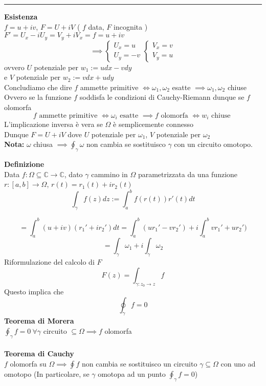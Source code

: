 \documentclass[a4paper]{article}
\newcommand{\C}{\mathbb{C}}
\begin{document}
\noindent\rule{\textwidth}{0.5pt}
\textbf{Esistenza}
\\$f=u+iv$, $F=U+iV$ ( $f$ data, $F$ incognita )
\\$F'=U_x-iU_y=V_y+iV_x=f=u+iv$
\[
	\implies \begin{cases}
	U_x=u\\U_y=-v
\end{cases}
	\begin{cases}
	V_x=v\\V_y=u
\end{cases}
\]
ovvero $U$ potenziale per $w_1:=udx-vdy$
\\e $V$ potenziale per $w_2:=vdx+udy$
\\Concludiamo che dire $f$ ammette primitive $\iff\omega_1,\omega_2$ esatte $\implies\omega_1,\omega_2$ chiuse
\\Ovvero se la funzione $f$ soddisfa le condizioni di Cauchy-Riemann dunque se $f$ olomorfa
\[f\text{ ammette primitive }\iff\omega_i \text{ esatte }\implies f \text{ olomorfa }\iff w_i\text{ chiuse }\]
L'implicazione inversa è vera se $\Omega$ è semplicemente connesso
\\Dunque $F=U+iV$ dove $U$ potenziale per $\omega_1$, $V$ potenziale per $\omega_2$
\\\textbf{Nota: } $\omega$ chiusa $\implies \oint_\gamma \omega$ non cambia se sostituisco $\gamma$ con un circuito omotopo. 
\begin{tcolorbox}
	\textbf{Definizione} 
	\\Data $f:\Omega\subseteq\C\to \C$, dato $\gamma$ cammino in $\Omega$ parametrizzata da una funzione $r:[a,b]\to \Omega$, $r(t)=r_1(t)+ir_2(t)$
	\[\int_{\gamma}^{} f(z)dz:=\int_{a}^{b} f(r(t))r'(t)dt\]

\end{tcolorbox}
	\[=\int_{a}^{b} (u+iv)(r_1'+ir_2')dt=\int_{a}^{b} (ur_1'-vr_2')+i \int_{a}^{b} vr_1'+ur_2')\]
	\[=\int_{\gamma}^{} \omega_1+i \int_{\gamma}^{}\omega_2\]
Riformulazione del calcolo di $F$
\[F(z)=\int_{\gamma:z_0\to z}^{} f \]
Questo implica che \[\oint_\gamma f=0\]
\textbf{Teorema di Morera}
\\ $\oint_\gamma f=0 \ \forall \gamma $ circuito $\subseteq \Omega \implies f$ olomorfa
\\\\\textbf{Teorema di Cauchy}
\\$f$ olomorfa su $\Omega\implies\oint f$ non cambia se sostituisco un circuito $\gamma \subseteq\Omega$ con uno ad omotopo (In particolare, se $\gamma$ omotopa ad un punto $\oint_\gamma f=0$)
\end{document}
